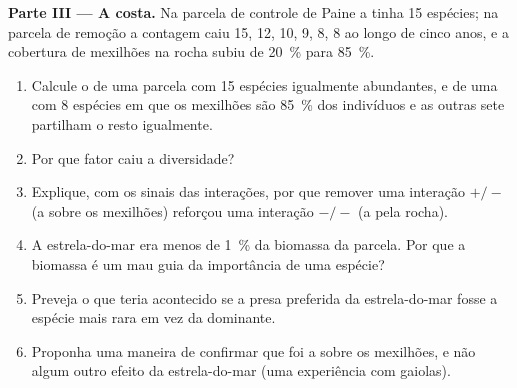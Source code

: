 \begin{problem}
\medskip
\noindent\textbf{Parte III --- A costa.}
Na parcela de controle de Paine a  tinha 15 espécies; na
parcela de remoção a contagem caiu 15, 12, 10, 9, 8, 8 ao longo de
cinco anos, e a cobertura de mexilhões na rocha subiu de \qty{20}{\%}
para \qty{85}{\%}.
\begin{enumerate}[resume]
  \item Calcule o  de uma parcela com 15 espécies
        igualmente abundantes, e de uma com 8 espécies em que os
        mexilhões são \qty{85}{\%} dos indivíduos e as outras sete
        partilham o resto igualmente.
  \item Por que fator caiu a diversidade?
  \item Explique, com os sinais das interações, por que remover uma
        interação $+/-$ (a  sobre os mexilhões) reforçou uma
        interação $-/-$ (a  pela rocha).
  \item A estrela-do-mar era menos de \qty{1}{\%} da biomassa da
        parcela. Por que a biomassa é um mau guia da importância de uma
        espécie?
  \item Preveja o que teria acontecido se a presa preferida da
        estrela-do-mar fosse a espécie mais rara em vez da dominante.
  \item Proponha uma maneira de confirmar que foi a  sobre os
        mexilhões, e não algum outro efeito da estrela-do-mar (uma
        experiência com gaiolas).
\end{enumerate}


\end{problem}
